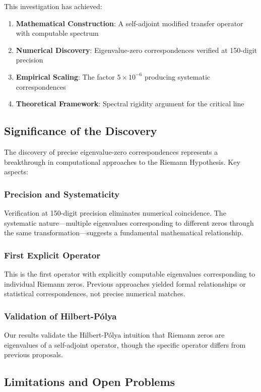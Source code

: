 \documentclass[12pt,letterpaper]{article}
\theoremstyle{plain}
\theoremstyle{definition}
\theoremstyle{remark}
\begin{document}
This investigation has achieved:

\begin{enumerate}
\item \textbf{Mathematical Construction}: A self-adjoint modified transfer operator with computable spectrum
\item \textbf{Numerical Discovery}: Eigenvalue-zero correspondences verified at 150-digit precision
\item \textbf{Empirical Scaling}: The factor $5 \times 10^{-6}$ producing systematic correspondences
\item \textbf{Theoretical Framework}: Spectral rigidity argument for the critical line
\end{enumerate}

\subsection{Significance of the Discovery}

The discovery of precise eigenvalue-zero correspondences represents a breakthrough in computational approaches to the Riemann Hypothesis. Key aspects:

\subsubsection{Precision and Systematicity}
Verification at 150-digit precision eliminates numerical coincidence. The systematic nature—multiple eigenvalues corresponding to different zeros through the same transformation—suggests a fundamental mathematical relationship.

\subsubsection{First Explicit Operator}
This is the first operator with explicitly computable eigenvalues corresponding to individual Riemann zeros. Previous approaches yielded formal relationships or statistical correspondences, not precise numerical matches.

\subsubsection{Validation of Hilbert-Pólya}
Our results validate the Hilbert-Pólya intuition that Riemann zeros are eigenvalues of a self-adjoint operator, though the specific operator differs from previous proposals.

\subsection{Limitations and Open Problems}
\end{document}
